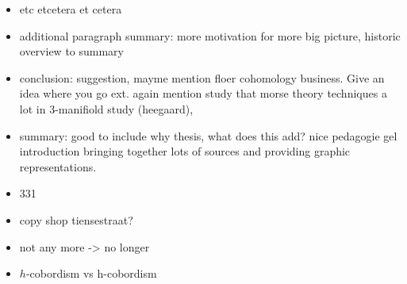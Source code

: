 \begin{itemize}
        \item etc etcetera et cetera
        \item additional paragraph summary: more motivation for more big picture, historic overview  to summary
        \item conclusion: suggestion, mayme mention floer cohomology business. Give an idea where you go ext.  again mention study that morse theory techniques a lot in 3-manifiold study (heegaard), 
        \item summary: good to include  why thesis, what does this add? nice pedagogie gel introduction bringing together lots of sources and providing graphic representations.
        \item 331
        \item copy shop tiensestraat?
        \item not any more -> no longer
        \item $h$-cobordism vs h-cobordism
\end{itemize}
